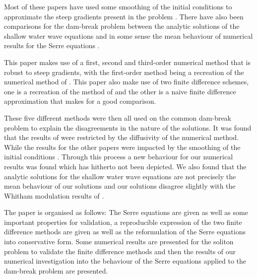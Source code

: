 \documentclass[SingleSpace,12pt,Proceedings]{Serre_ASCE}
\begin{document}
Most of these papers have used some smoothing of the initial conditions to approximate the steep gradients present in the problem \cite{El-etal-2006,Mitsotakis-etal-2014,Dutykh-2014-315}. There have also been comparisons for the dam-break problem between the analytic solutions of the shallow water wave equations and in some sense the mean behaviour of numerical results for the Serre equations \cite{Hank-etal-2010-2034,Dutykh-2014-315}.  

This paper makes use of a first, second and third-order numerical method \cite{Zoppou-etal-2017} that is robust to steep gradients, with the first-order method being a recreation of the numerical method of . This paper also make use of two finite difference schemes, one is a recreation of the method of  and the other is a naive finite difference approximation that makes for a good comparison.

These five different methods were then all used on the common dam-break problem \cite{El-etal-2006,Hank-etal-2010-2034} to explain the disagreements in the nature of the solutions. It was found that the results of  were restricted by the diffusivity of the numerical method. While the results for the other papers were impacted by the smoothing of the initial conditions \cite{El-etal-2006,Hank-etal-2010-2034}. Through this process a new behaviour for our numerical results was found which has hitherto not been depicted. We also found that the analytic solutions for the shallow water wave equations are not precisely the mean behaviour of our solutions and our solutions disagree slightly with the Whitham modulation results of .   

The paper is organised as follows: The Serre equations are given as well as some important properties for validation, a reproducible expression of the two finite difference methods are given as well as the reformulation of the Serre equations into conservative form. Some numerical results are presented for the soliton problem to validate the finite difference methods and then the results of our numerical investigation into the behaviour of the Serre equations applied to the dam-break problem are presented. 

\end{document}
